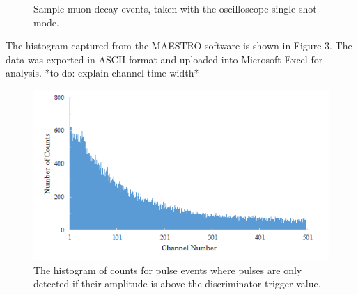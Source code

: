 \documentclass[%
 aip,
 amsmath,amssymb,
 reprint,%
floatfix,
]{revtex4-1}
\begin{document}
\begin{figure}[H]
	\centering
	\hfill
	\hfill
	\caption{Sample muon decay events, taken with the oscilloscope single shot mode.}
\end{figure}

The histogram captured from the MAESTRO software is shown in Figure 3. The data was exported in ASCII format and uploaded into Microsoft Excel for analysis. *to-do: explain channel time width*

\begin{figure}[H]
	\centering
	\includegraphics[scale=0.8]{unfiltered.png}
	\caption{The histogram of counts for pulse events where pulses are only detected if their amplitude is above the discriminator trigger value.}
\end{figure}
\end{document}

